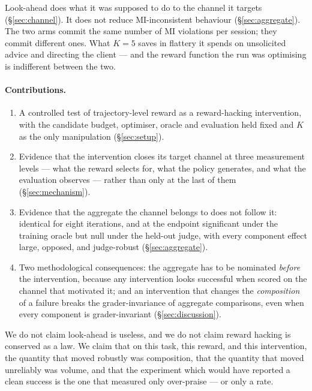 Look-ahead does what it was supposed to do to the channel it targets
(\S\ref{sec:channel}). It does not reduce MI-inconsistent behaviour (\S\ref{sec:aggregate}). The
two arms commit the same number of MI violations per session; they commit different ones. What
$K{=}5$ saves in flattery it spends on unsolicited advice and directing the client --- and the
reward function the run was optimising is indifferent between the two.

\paragraph{Contributions.}
\begin{enumerate}
  \item A controlled test of trajectory-level reward as a reward-hacking intervention, with the
        candidate budget, optimiser, oracle and evaluation held fixed and $K$ as the only
        manipulation (\S\ref{sec:setup}).
  \item Evidence that the intervention closes its target channel at three measurement levels ---
        what the reward selects for, what the policy generates, and what the evaluation observes
        --- rather than only at the last of them (\S\ref{sec:mechanism}).
  \item Evidence that the aggregate the channel belongs to does not follow it: identical for eight
        iterations, and at the endpoint significant under the training oracle but null under the
        held-out judge, with every component effect large, opposed, and judge-robust
        (\S\ref{sec:aggregate}).
  \item Two methodological consequences: the aggregate has to be nominated \emph{before} the
        intervention, because any intervention looks successful when scored on the channel that
        motivated it; and an intervention that changes the \emph{composition} of a failure breaks
        the grader-invariance of aggregate comparisons, even when every component is
        grader-invariant (\S\ref{sec:discussion}).
\end{enumerate}

We do not claim look-ahead is useless, and we do not claim reward hacking is conserved as a law.
We claim that on this task, this reward, and this intervention, the quantity that moved robustly
was composition, that the quantity that moved unreliably was volume, and that the experiment which
would have reported a clean success is the one that measured only over-praise --- or only a rate.

